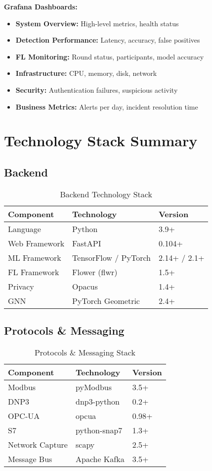 \documentclass[12pt,a4paper]{article}
\begin{document}
\textbf{Grafana Dashboards:}
\begin{itemize}[leftmargin=1cm,itemsep=0pt]
    \item \textbf{System Overview:} High-level metrics, health status
    \item \textbf{Detection Performance:} Latency, accuracy, false positives
    \item \textbf{FL Monitoring:} Round status, participants, model accuracy
    \item \textbf{Infrastructure:} CPU, memory, disk, network
    \item \textbf{Security:} Authentication failures, suspicious activity
    \item \textbf{Business Metrics:} Alerts per day, incident resolution time
\end{itemize}

\section{Technology Stack Summary}

\subsection{Backend}

\begin{table}[H]
\centering
\small
\begin{tabular}{|l|l|l|}
\hline
\textbf{Component} & \textbf{Technology} & \textbf{Version} \\
\hline
Language & Python & 3.9+ \\
Web Framework & FastAPI & 0.104+ \\
ML Framework & TensorFlow / PyTorch & 2.14+ / 2.1+ \\
FL Framework & Flower (flwr) & 1.5+ \\
Privacy & Opacus & 1.4+ \\
GNN & PyTorch Geometric & 2.4+ \\
\hline
\end{tabular}
\caption{Backend Technology Stack}
\end{table}

\subsection{Protocols \& Messaging}

\begin{table}[H]
\centering
\small
\begin{tabular}{|l|l|l|}
\hline
\textbf{Component} & \textbf{Technology} & \textbf{Version} \\
\hline
Modbus & pyModbus & 3.5+ \\
DNP3 & dnp3-python & 0.2+ \\
OPC-UA & opcua & 0.98+ \\
S7 & python-snap7 & 1.3+ \\
Network Capture & scapy & 2.5+ \\
Message Bus & Apache Kafka & 3.5+ \\
\hline
\end{tabular}
\caption{Protocols \& Messaging Stack}
\end{table}
\end{document}

